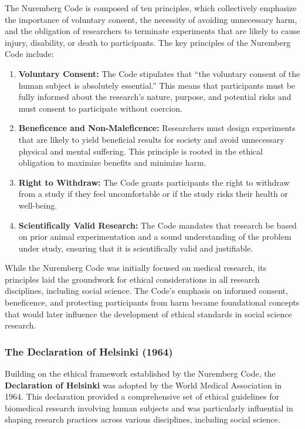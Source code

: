 \documentclass[
]{book}
\begin{document}
The Nuremberg Code is composed of ten principles, which collectively emphasize the importance of voluntary consent, the necessity of avoiding unnecessary harm, and the obligation of researchers to terminate experiments that are likely to cause injury, disability, or death to participants. The key principles of the Nuremberg Code include:

\begin{enumerate}
\def\labelenumi{\arabic{enumi}.}
\item
  \textbf{Voluntary Consent:} The Code stipulates that ``the voluntary consent of the human subject is absolutely essential.'' This means that participants must be fully informed about the research's nature, purpose, and potential risks and must consent to participate without coercion.
\item
  \textbf{Beneficence and Non-Maleficence:} Researchers must design experiments that are likely to yield beneficial results for society and avoid unnecessary physical and mental suffering. This principle is rooted in the ethical obligation to maximize benefits and minimize harm.
\item
  \textbf{Right to Withdraw:} The Code grants participants the right to withdraw from a study if they feel uncomfortable or if the study risks their health or well-being.
\item
  \textbf{Scientifically Valid Research:} The Code mandates that research be based on prior animal experimentation and a sound understanding of the problem under study, ensuring that it is scientifically valid and justifiable.
\end{enumerate}

While the Nuremberg Code was initially focused on medical research, its principles laid the groundwork for ethical considerations in all research disciplines, including social science. The Code's emphasis on informed consent, beneficence, and protecting participants from harm became foundational concepts that would later influence the development of ethical standards in social science research.

\subsubsection*{The Declaration of Helsinki (1964)}\label{the-declaration-of-helsinki-1964}

Building on the ethical framework established by the Nuremberg Code, the \textbf{Declaration of Helsinki} was adopted by the World Medical Association in 1964. This declaration provided a comprehensive set of ethical guidelines for biomedical research involving human subjects and was particularly influential in shaping research practices across various disciplines, including social science.
\end{document}
